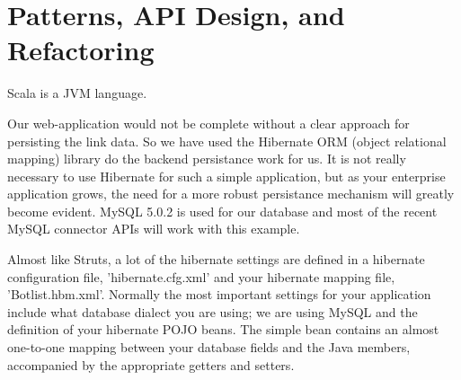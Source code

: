\chapter{Patterns, API Design, and Refactoring}

Scala is a JVM language.

Our web-application would not be complete without a clear approach 
for persisting the link data. So we have used the Hibernate ORM 
(object relational mapping) library do the backend persistance work for us. 
It is not really necessary to use Hibernate for such a simple 
application, but as your enterprise application grows, 
the need for a more robust persistance mechanism will greatly become evident. 
MySQL 5.0.2 is used for our database and most of the recent 
MySQL connector APIs will work with this example.

Almost like Struts, a lot of the hibernate settings 
are defined in a hibernate configuration file, 'hibernate.cfg.xml' 
and your hibernate mapping file, 'Botlist.hbm.xml'. 
Normally the most important settings for your application 
include what database dialect you are using; we are using MySQL 
and the definition of your hibernate POJO beans. 
The simple bean contains an almost one-to-one mapping between 
your database fields and the Java members, accompanied by 
the appropriate getters and setters.
